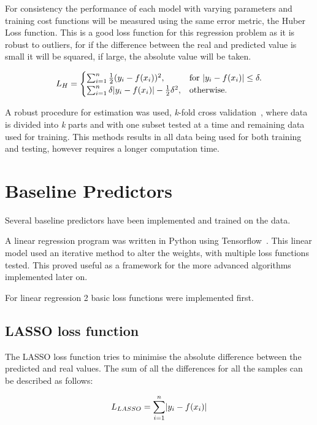 \documentclass[10pt,twocolumn,letterpaper]{article}
\DeclarePairedDelimiter\abs{\lvert}{\rvert}%
\begin{document}
For consistency the performance of each model with varying parameters and training cost functions will be measured using the same error metric, the Huber Loss function. This is a good loss function for this regression problem as it is robust to outliers, for if the difference between the real and predicted value is small it will be squared, if large, the absolute value will be taken.

\begin{equation}
L_H = \begin{cases}
\sum_{i = 1}^{n} \frac{1}{2} (y_i - f(x_i))^2, & \text{for\ } \abs{y_i - f(x_i)} \leq \delta. \\
\sum_{i = 1}^{n} \delta \abs{y_i - f(x_i)} - \frac{1}{2} \delta^2, & \text{otherwise.}
\end{cases}
\label{eq:huber}
\end{equation}

A robust procedure for estimation was used, \textit{k}-fold cross validation~\cite{CrossValidation}, where data is divided into \textit{k} parts and with one subset tested at a time and remaining data used for training. This methods results in all data being used for both training and testing, however requires a longer computation time.

\section{Baseline Predictors}
Several baseline predictors have been implemented and trained on the data. 

A linear regression program was written in Python using Tensorflow~\cite{tensorflow2015-whitepaper}. This linear model used an iterative method to alter the weights, with multiple loss functions tested. This proved useful as a framework for the more advanced algorithms implemented later on.

For linear regression 2 basic loss functions were implemented first.

\subsection{LASSO loss function}
The LASSO loss function tries to minimise the absolute difference between the predicted and real values. The sum of all the differences for all the samples can be described as follows:

\begin{equation}
L_{LASSO} = \sum_{i = 1}^{n} \abs{y_i - f(x_i)}
\label{eq:lasso}
\end{equation}
\end{document}
